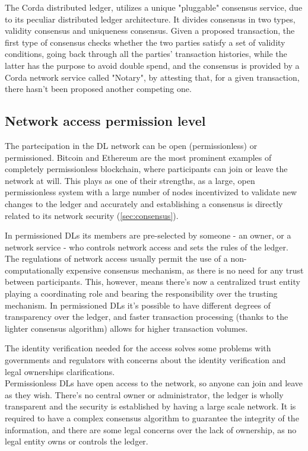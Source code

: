 The Corda distributed ledger, utilizes a unique "pluggable" consensus service, due to its peculiar distributed ledger architecture. It divides consensus in two types, validity consensus and uniqueness consensus. Given a proposed transaction, the first type of consensus checks whether the two parties satisfy a set of validity conditions, going back through all the parties' transaction histories, while the latter has the purpose to avoid double spend, and the consensus is provided by a Corda network service called "Notary", by attesting that, for a given transaction, there hasn't been proposed another competing one.\\


\subsection{Network access permission level}

The partecipation in the DL network can be open (permissionless) or permissioned. Bitcoin and Ethereum are the most prominent examples of completely permissionless blockchain, where participants can join or leave the network at will. This plays as one of their strengths, as a large, open permissionless system with a large number of nodes incentivized to validate new changes to the ledger and accurately and establishing a consensus is directly related to its network security (\ref{sec:consensus}).

In permissioned DLs its members are pre-selected by someone - an owner, or a network service - who controls network access and sets the rules of the ledger. The regulations of network access usually permit the use of a non-computationally expensive consensus mechanism, as there is no need for any trust between participants. This, however, means there's now a centralized trust entity playing a coordinating role and bearing the responsibility over the trusting mechanism. 
In permissioned DLs it's possible to have different degrees of transparency over the ledger, and faster transaction processing (thanks to the lighter consensus algorithm) allows for higher transaction volumes.

The identity verification needed for the access solves some problems with governments and regulators with concerns about the identity verification and legal ownerships clarifications. \\

Permissionless DLs have open access to the network, so anyone can join and leave as they wish. There's no central owner or administrator, the ledger is wholly transparent and the security is established by having a large scale network. It is required to have a complex consensus algorithm to guarantee the integrity of the information, and there are some legal concerns over the lack of ownership, as no legal entity owns or controls the ledger.

